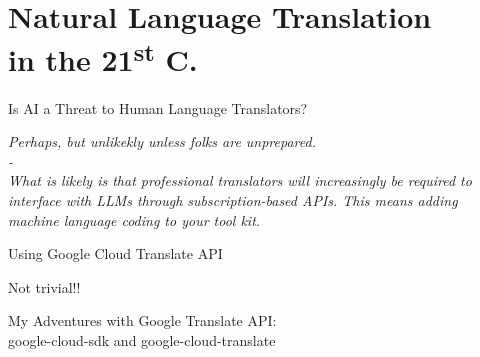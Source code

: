\documentclass{beamer}
\begin{document}
\section{Natural Language Translation \\
in the 21\textsuperscript{st}  C.}

\begin{frame}{Is AI a Threat to Human Language Translators?}

\large \textit{Perhaps, but unlikekly unless folks are unprepared. \\-\\
What is likely is that professional translators will increasingly be required to interface with LLMs through subscription-based APIs. This means adding machine language coding to your tool kit.}

\end{frame}

\begin{frame}{Using Google Cloud Translate API}

\large {Not trivial!!}

\end{frame}

\begin{frame}{My Adventures with Google Translate API:\\
google-cloud-sdk and google-cloud-translate}


\end{frame}
\end{document}
